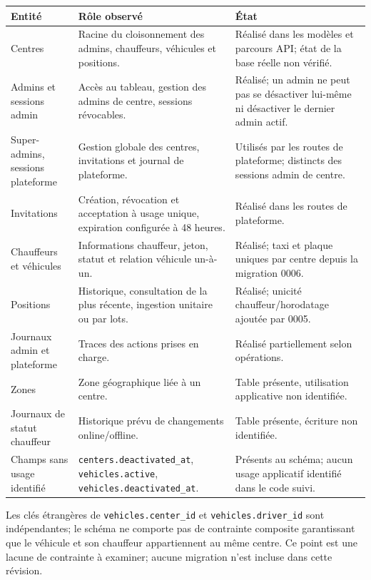 \documentclass[12pt,a4paper]{article}
\begin{document}
\small
\begin{longtable}{p{3.2cm}p{4.9cm}p{5.6cm}}
\toprule
Entité & Rôle observé & État\\
\midrule
\endhead
Centres & Racine du cloisonnement des admins, chauffeurs, véhicules et positions. & Réalisé dans les modèles et parcours API; état de la base réelle non vérifié.\\
Admins et sessions admin & Accès au tableau, gestion des admins de centre, sessions révocables. & Réalisé; un admin ne peut pas se désactiver lui-même ni désactiver le dernier admin actif.\\
Super-admins, sessions plateforme & Gestion globale des centres, invitations et journal de plateforme. & Utilisés par les routes de plateforme; distincts des sessions admin de centre.\\
Invitations & Création, révocation et acceptation à usage unique, expiration configurée à 48 heures. & Réalisé dans les routes de plateforme.\\
Chauffeurs et véhicules & Informations chauffeur, jeton, statut et relation véhicule un-à-un. & Réalisé; taxi et plaque uniques par centre depuis la migration 0006.\\
Positions & Historique, consultation de la plus récente, ingestion unitaire ou par lots. & Réalisé; unicité chauffeur/horodatage ajoutée par 0005.\\
Journaux admin et plateforme & Traces des actions prises en charge. & Réalisé partiellement selon opérations.\\
Zones & Zone géographique liée à un centre. & Table présente, utilisation applicative non identifiée.\\
Journaux de statut chauffeur & Historique prévu de changements online/offline. & Table présente, écriture non identifiée.\\
Champs sans usage identifié & \texttt{centers.deactivated\_at}, \texttt{vehicles.active}, \texttt{vehicles.deactivated\_at}. & Présents au schéma; aucun usage applicatif identifié dans le code suivi.\\
\bottomrule
\end{longtable}
\normalsize

Les clés étrangères de \texttt{vehicles.center\_id} et \texttt{vehicles.driver\_id} sont indépendantes; le schéma ne comporte pas de contrainte composite garantissant que le véhicule et son chauffeur appartiennent au même centre. Ce point est une lacune de contrainte à examiner; aucune migration n'est incluse dans cette révision.
\end{document}

